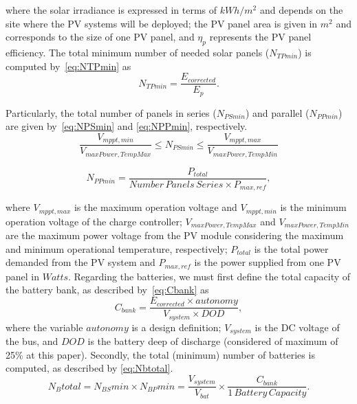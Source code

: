 \documentclass[10pt,conference]{IEEEtran}
\begin{document}
\noindent where the solar irradiance is expressed in terms of $kWh/m^{2}$ and depends on the site where the PV systems will be deployed; the PV panel area is given in $m^{2}$ and corresponds to the size of one PV panel, and $\eta_{p}$ represents the PV panel efficiency.
%
The total minimum number of needed solar panels ($N_{TPmin}$) is computed by~\eqref{eq:NTPmin} as
\begin{equation}
\label{eq:NTPmin}
\scriptstyle N_{TPmin} = \dfrac{\scriptstyle E_{corrected}}{\scriptstyle E_{p}}.
\end{equation}

Particularly, the total number of panels in series ($N_{PSmin}$) and parallel ($N_{PPmin}$) are given by~\eqref{eq:NPSmin} and \eqref{eq:NPPmin}, respectively.  
%
\begin{equation}
\label{eq:NPSmin}
\dfrac{\scriptstyle V_{mppt,min}}{\scriptstyle V_{maxPower,TempMax}} \scriptstyle \leq \scriptstyle N_{PSmin} \leq \dfrac{\scriptstyle V_{mppt,max}}{\scriptstyle V_{maxPower,TempMin}}
\end{equation}

\begin{equation}
\label{eq:NPPmin}
\scriptstyle N_{PPmin} = \dfrac{\scriptstyle P_{total}}{\scriptstyle Number\,Panels\,Series \scriptstyle \times \scriptstyle P_{max,ref}},
\end{equation}

\noindent where $V_{mppt,max}$ is the maximum operation voltage and $V_{mppt,min}$ is the minimum operation voltage of the charge controller; $V_{maxPower,TempMax}$ and $V_{maxPower,TempMin}$ are the maximum power voltage from the PV module considering the maximum and minimum operational temperature, respectively; $P_{total}$ is the total power demanded from the PV system and $P_{max,ref}$ is the power supplied from one PV panel in $Watts$.
%
Regarding the batteries, we must first define the total capacity of the battery bank, as described by~\eqref{eq:Cbank} as
\begin{equation}
\label{eq:Cbank}
\scriptstyle C_{bank} \scriptstyle = \dfrac{\scriptstyle E_{corrected} \scriptstyle \times \scriptstyle autonomy}{\scriptstyle V_{system} \scriptstyle \times \scriptstyle DOD},
\end{equation}
%
\noindent where the variable $autonomy$ is a design definition; %
$ V_{system} $ is the DC voltage of the bus, and $ DOD $ is the battery deep of discharge (considered of maximum of 25\% at this paper).
%
Secondly, the total (minimum) number of batteries is computed, as described by \eqref{eq:Nbtotal}. 
\begin{equation}
\label{eq:Nbtotal}
\scriptstyle N_{B}total = \scriptstyle N_{BS}min \scriptstyle \times \scriptstyle N_{BP}min = \dfrac{\scriptstyle V_{system}}{\scriptstyle V_{bat}} \scriptstyle \times \dfrac{\scriptstyle C_{bank}}{\scriptstyle 1 \,Battery \, Capacity}.
\end{equation}
\end{document}
